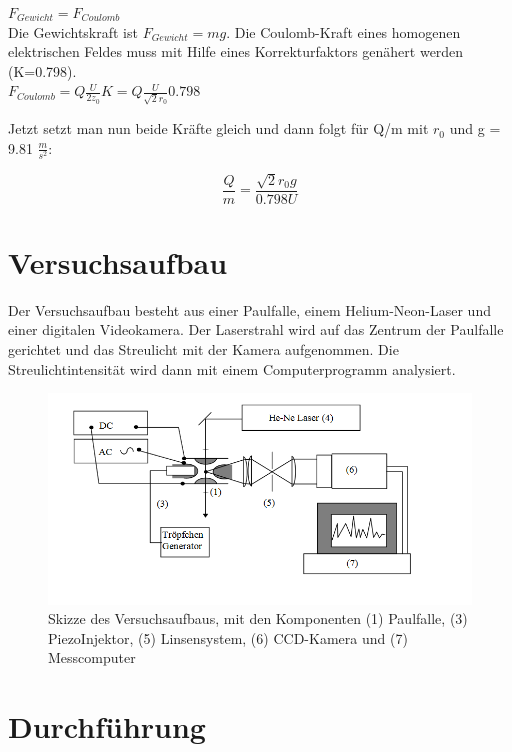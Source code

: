 \documentclass[10pt,a4paper]{article}
\begin{document}
$F_{Gewicht}=F_{Coulomb}$
\\
Die Gewichtskraft ist $F_{Gewicht}=mg$. Die Coulomb-Kraft eines homogenen elektrischen Feldes muss mit Hilfe eines Korrekturfaktors genähert werden (K=0.798). \\

$F_{Coulomb}=Q\frac{U}{2z_0}K=Q\frac{U}{\sqrt2 r_0}0.798$

Jetzt setzt man nun beide Kräfte gleich und dann folgt für Q/m mit $r_0 $ und g = 9.81 $\frac{m}{s^2}$:

\begin{equation}
\frac{Q}{m}=\frac{\sqrt2 r_0 g}{0.798 U}
\label {7}
\end{equation}

\section{Versuchsaufbau}

Der Versuchsaufbau besteht aus einer Paulfalle, einem Helium-Neon-Laser und einer digitalen Videokamera. Der Laserstrahl wird auf das Zentrum der Paulfalle gerichtet und das Streulicht mit der Kamera aufgenommen. Die Streulichtintensität wird dann mit einem Computerprogramm analysiert.

\begin{figure}[h]
	\includegraphics[scale = 0.5]{aufbau.png}
	\centering
	\caption{ Skizze des Versuchsaufbaus, mit den Komponenten (1) Paulfalle, (3) PiezoInjektor, (5) Linsensystem, (6) CCD-Kamera und (7) Messcomputer}
	\label{aufbau}
\end{figure}

\section{Durchführung}
\end{document}
